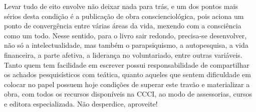 \documentclass{gescons}
\begin{document}
\begin{multicols}{2}
Levar tudo de eito envolve não deixar nada para trás, e um dos pontos mais sérios desta condição é a publicação de obra conscienciológica, pois aciona um ponto de convergência entre várias áreas da vida, mexendo com a consciência como um todo. Nesse sentido, para o livro sair redondo, precisa-se desenvolver, não só a intelectualidade, mas também o parapsiquismo, a autopesquisa, a vida financeira, a parte afetiva, a liderança no voluntariado, entre outras variáveis. Tanto quem tem facilidade em escrever possui responsabilidade de compartilhar os achados pesquisísticos com teática, quanto aqueles que sentem dificuldade em colocar no papel possuem hoje condições de superar este travão e materializar a obra, com todos os recursos disponíveis na CCCI, ao modo de assessorias, cursos e editora especializada. Não desperdice, aproveite!

    \end{multicols}
\end{document}
